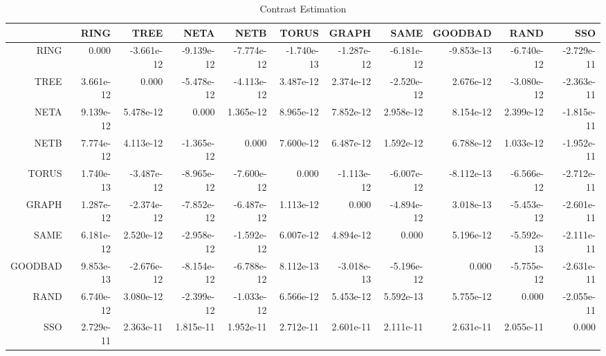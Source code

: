 \documentclass[a4paper,10pt]{article}
\begin{document}
\begin{landscape}
\begin{table}[!htp]
\centering\tiny
\caption{Contrast Estimation}
\begin{tabular}{
|r|r|r|r|r|r|r|r|r|r|r|}
\hline
 & RING& TREE& NETA& NETB& TORUS& GRAPH& SAME& GOODBAD& RAND& SSO\\
\hline
 RING&0.000&-3.661e-12&-9.139e-12&-7.774e-12&-1.740e-13&-1.287e-12&-6.181e-12&-9.853e-13&-6.740e-12&-2.729e-11\\
\hline
 TREE&3.661e-12&0.000&-5.478e-12&-4.113e-12&3.487e-12&2.374e-12&-2.520e-12&2.676e-12&-3.080e-12&-2.363e-11\\
\hline
 NETA&9.139e-12&5.478e-12&0.000&1.365e-12&8.965e-12&7.852e-12&2.958e-12&8.154e-12&2.399e-12&-1.815e-11\\
\hline
 NETB&7.774e-12&4.113e-12&-1.365e-12&0.000&7.600e-12&6.487e-12&1.592e-12&6.788e-12&1.033e-12&-1.952e-11\\
\hline
 TORUS&1.740e-13&-3.487e-12&-8.965e-12&-7.600e-12&0.000&-1.113e-12&-6.007e-12&-8.112e-13&-6.566e-12&-2.712e-11\\
\hline
 GRAPH&1.287e-12&-2.374e-12&-7.852e-12&-6.487e-12&1.113e-12&0.000&-4.894e-12&3.018e-13&-5.453e-12&-2.601e-11\\
\hline
 SAME&6.181e-12&2.520e-12&-2.958e-12&-1.592e-12&6.007e-12&4.894e-12&0.000&5.196e-12&-5.592e-13&-2.111e-11\\
\hline
 GOODBAD&9.853e-13&-2.676e-12&-8.154e-12&-6.788e-12&8.112e-13&-3.018e-13&-5.196e-12&0.000&-5.755e-12&-2.631e-11\\
\hline
 RAND&6.740e-12&3.080e-12&-2.399e-12&-1.033e-12&6.566e-12&5.453e-12&5.592e-13&5.755e-12&0.000&-2.055e-11\\
\hline
 SSO&2.729e-11&2.363e-11&1.815e-11&1.952e-11&2.712e-11&2.601e-11&2.111e-11&2.631e-11&2.055e-11&0.000\\
\hline

\end{tabular}
\end{table}

\newpage


\end{landscape}
\end{document}
